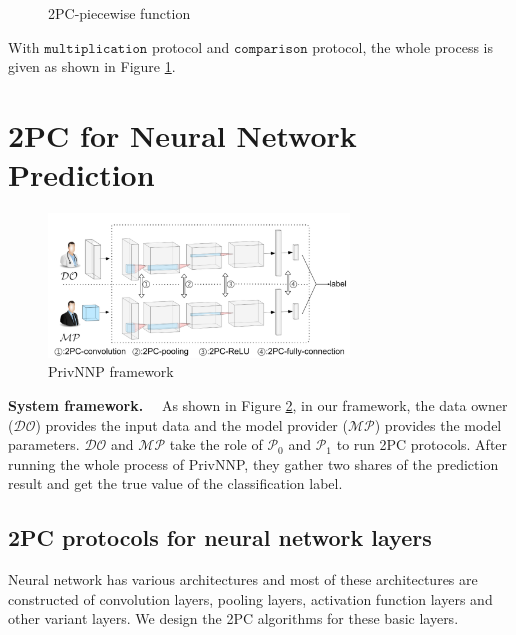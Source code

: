 \documentclass[letterpaper]{article} %
\begin{document}
\begin{figure}[ht]
{\begin{tabular}{lcl}
    \end{tabular}}
    \caption{2PC-piecewise function}
    \label{2PC-piecewise}


    \end{figure}
    With $\mathtt{multiplication}$ protocol and $\mathtt{comparison}$ protocol,
    the whole process is given as shown in Figure \ref{2PC-piecewise}.

    \section{2PC for Neural Network Prediction}


    \begin{figure}[ht]

        \centering
        \includegraphics[width=8cm]{screenshot3.png}
        \caption{PrivNNP framework}
        \label{framework}
    \end{figure}

    \textbf{System framework.}~~
    As shown in Figure \ref{framework}, in our framework,
    the data owner ($\mathcal{DO}$) provides the input data
    and the model provider ($\mathcal{MP}$) provides the model parameters.
    $\mathcal{DO}$ and $\mathcal{MP}$ take the role of
    $\mathcal{P}_{0}$ and $\mathcal{P}_{1}$ to run 2PC protocols.
    After running the whole process of PrivNNP, they gather two shares of the prediction result and
    get the true value of the classification label.

\subsection{2PC protocols for neural network layers}
    Neural network has various architectures and
    most of these architectures are constructed of convolution layers,
    pooling layers, activation function layers and other variant layers.
    We design the 2PC algorithms for these basic layers.
\end{document}
